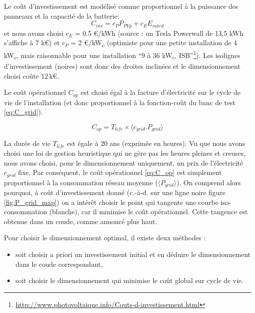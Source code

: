 \documentclass[a4paper,10pt,twocolumn]{article}
\providecommand{\avg}[1]{\langle#1\rangle}
\newcommand\sub[1]{\textsubscript{#1}}
\newcommand\kWc{kW\sub{c}{}} %
\begin{document}
Le coût d'investissement est modélisé comme proportionnel à la puissance
des panneaux et la capacité de la batterie:
%
\begin{equation} \label{eq:C_inv}
  C_{inv} = c_P P_{PVp} + c_E E_{rated}
\end{equation} 
et nous avons choisi $c_E$ = 0.5 €/kWh (source : un Tesla Powerwall de 13,5 kWh s'affiche à 7 k€)
et $c_P$ = 2 €/\kWc{} (optimiste pour une petite installation de 4\,\kWc,
mais raisonnable pour une installation ``9 à 36 \kWc, ISB''\footnote{\url{http://www.photovoltaique.info/Couts-d-investissement.html}}).
Les isolignes d'investissement (noires) sont donc des droites inclinées
et le dimensionnement choisi coûte 12\,k€.

Le coût opérationnel $C_{op}$ est choisi égal à la facture d'électricité
sur le cycle de vie de l'installation (et donc proportionnel à la fonction-coût
du banc de test \eqref{eq:C_grid}).

\begin{equation} \label{eq:C_op}
  C_{op} = T_{life} \times \avg{c_{grid}.P_{grid} }
\end{equation} 

La durée de vie $T_{life}$ est égale à 20 ans (exprimée en heures).
Vu que nous avons choisi une loi de gestion heuristique qui ne gère pas les heures pleines et creuses,
nous avons choisi, pour le dimensionnement uniquement, un prix de l'électricité $c_{grid}$ fixe.
Par conséquent, le coût opérationnel \eqref{eq:C_op} est simplement proportionnel à
la consommation réseau moyenne ($\avg{P_{grid}}$).
On comprend alors pourquoi, à coût d'investissement donné (c.-à-d. sur une ligne noire figure \ref{fig:P_grid_map})
on a intérêt choisir le point qui tangente une courbe iso-consommation (blanche),
car il minimise le coût opérationnel. Cette tangence est obtenue dans un coude, comme annoncé plus haut.

Pour choisir le dimensionnement optimal, il existe deux méthodes :

\begin{itemize}
 \item soit choisir a priori un investissement initial et en déduire le dimensionnement
 dans le coude correspondant,
 \item soit choisir le dimensionnement qui minimise le coût global sur cycle de vie.
\end{itemize}
\end{document}
